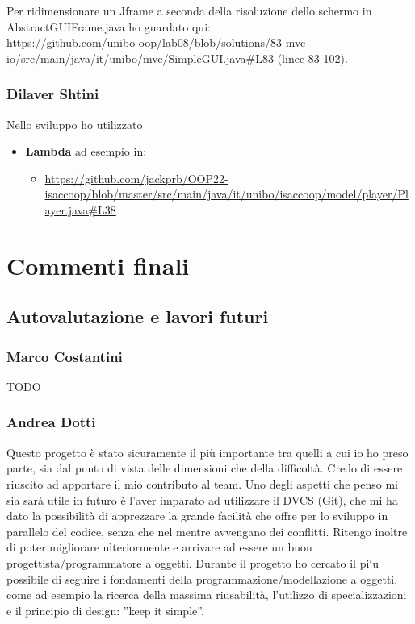 \documentclass[a4paper,12pt]{report}
\begin{document}
Per ridimensionare un Jframe a seconda della risoluzione dello schermo in AbstractGUIFrame.java ho guardato qui:
\\\url{https://github.com/unibo-oop/lab08/blob/solutions/83-mvc-io/src/main/java/it/unibo/mvc/SimpleGUI.java#L83} (linee 83-102).

\subsection*{Dilaver Shtini}
Nello sviluppo ho utilizzato
\begin{itemize}
\item \textbf{Lambda} ad esempio in:
    \begin{itemize}
        \item \url{https://github.com/jackprb/OOP22-isaccoop/blob/master/src/main/java/it/unibo/isaccoop/model/player/Player.java#L38}
    \end{itemize}
\end{itemize}


\chapter{Commenti finali}

\section{Autovalutazione e lavori futuri}
\subsection*{Marco Costantini}
{TODO}

\subsection*{Andrea Dotti}
Questo progetto è stato sicuramente il più importante tra quelli a cui io ho preso parte, sia dal punto di vista delle dimensioni che della difficoltà. Credo di essere riuscito ad apportare il mio contributo al team. Uno degli aspetti che penso mi sia sarà utile in futuro è l’aver imparato ad utilizzare il DVCS (Git), che mi ha dato la possibilità di apprezzare la grande facilità che offre per lo sviluppo in parallelo del codice, senza che nel mentre avvengano dei conflitti. Ritengo inoltre di poter migliorare ulteriormente e arrivare ad essere un buon progettista/programmatore a oggetti. Durante il progetto ho cercato il pi`u possibile di seguire i fondamenti della programmazione/modellazione a oggetti, come ad esempio la ricerca della massima riusabilità, l’utilizzo di specializzazioni e il principio di design: ”keep it simple”.
\end{document}
